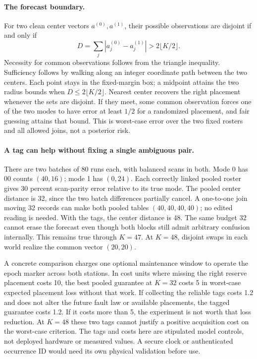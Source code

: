 \documentclass{article}
\begin{document}
\paragraph{The forecast boundary.}
For two clean center vectors $a^{(0)},a^{(1)}$, their possible
observations are disjoint if and only if
\[
  D=\sum_j |a_j^{(0)}-a_j^{(1)}|>2\lfloor K/2\rfloor .
\]
Necessity for common observations follows from the triangle inequality.
Sufficiency follows by walking along an integer coordinate path between
the two centers. Each point stays in the fixed-margin box; a midpoint
attains the two radius bounds when $D\le 2\lfloor K/2\rfloor$.
Nearest center recovers the right placement whenever the sets are
disjoint. If they meet, some common observation forces one of the two
modes to have error at least $1/2$ for a randomized placement, and
fair guessing attains that bound. This is worst-case error over
the two fixed rosters and all allowed joins, not a posterior risk.

\paragraph{A tag can help without fixing a single ambiguous pair.}
There are two batches of 80 runs each, with balanced scans in both.
Mode 0 has $00$ counts $(40,16)$; mode 1 has $(0,24)$. Each correctly
linked pooled roster gives 30 percent scan-parity error relative to
its true mode. The pooled center distance is 32, since the two batch
differences partially cancel. A one-to-one join moving 32 records
can make both pooled tables $(40,40,40,40)$; no edited reading is
needed. With the tags, the center distance is 48. The same budget 32
cannot erase the forecast even though both blocks still admit arbitrary
confusion internally. This remains true through $K=47$. At $K=48$,
disjoint swaps in each world realize the common vector $(20,20)$.

A concrete comparison charges one optional maintenance window to
operate the epoch marker across both stations. In cost units where
missing the right reserve placement costs 10, the best pooled
guarantee at $K=32$ costs 5 in worst-case expected placement loss
without that work. If collecting the reliable tags costs 1.2 and
does not alter the future fault law or available placements, the
tagged guarantee costs 1.2. If it costs more than 5, the experiment
is not worth that loss reduction. At $K=48$ these two tags cannot
justify a positive acquisition cost on the worst-case criterion.
The tags and costs here are stipulated model controls, not deployed
hardware or measured values. A secure clock or authenticated
occurrence ID would need its own physical validation before use.
\end{document}
